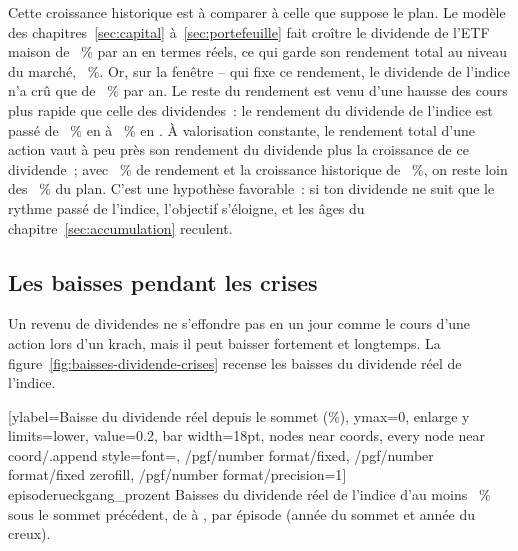 Cette croissance historique est \`a comparer \`a celle que suppose le plan. Le mod\`ele des
chapitres~\ref{sec:capital} \`a~\ref{sec:portefeuille} fait cro\^itre le dividende de l'ETF maison de
\CroissanceModeleMaison~\% par an en termes r\'eels, ce qui garde son rendement total au niveau du
march\'e, \RenditeReal~\%. Or, sur la fen\^etre \FenetreMarcheDebut--\FenetreMarcheFin{} qui fixe ce
rendement, le dividende de l'indice n'a cr\^u que de \ShillerDivCroissanceFenetre~\% par an. Le reste du
rendement est venu d'une hausse des cours plus rapide que celle des dividendes~: le rendement du
dividende de l'indice est pass\'e de \ShillerRendementDebutFenetre~\% en \FenetreMarcheDebut{} \`a
\ShillerRendementFinFenetre~\% en \FenetreMarcheFin. \`A valorisation constante, le rendement total
d'une action vaut \`a peu pr\`es son rendement du dividende plus la croissance de ce dividende~; avec
\RenditeDivMaison~\% de rendement et la croissance historique de \ShillerDivCroissanceFenetre~\%, on
reste loin des \RenditeReal~\% du plan.  C'est une hypoth\`ese favorable~: si ton dividende ne suit que le rythme pass\'e
de l'indice, l'objectif s'\'eloigne, et les \^ages du chapitre~\ref{sec:accumulation} reculent.

\subsection{Les baisses pendant les crises}\label{sec:risques-baisses}

Un revenu de dividendes ne s'effondre pas en un jour comme le cours d'une action lors d'un krach, mais
il peut baisser fortement et longtemps. La figure~\ref{fig:baisses-dividende-crises} recense les
baisses du dividende r\'eel de l'indice.


[ylabel={Baisse du dividende r\'eel depuis le sommet (\%)},
  ymax=0, enlarge y limits={lower, value=0.2}, bar width=18pt,
  nodes near coords, every node near coord/.append style={font=\scriptsize,
    /pgf/number format/fixed, /pgf/number format/fixed zerofill, /pgf/number format/precision=1}]%
  {episode}{rueckgang_prozent}%
  {Baisses du dividende r\'eel de l'indice \IndiceActionsUs{} d'au moins \SeuilBaisseHistorique~\%
  sous le sommet pr\'ec\'edent, de \ShillerDebut{} \`a \ShillerFin, par \'episode (ann\'ee du sommet et
  ann\'ee du creux).\label{fig:baisses-dividende-crises}}

